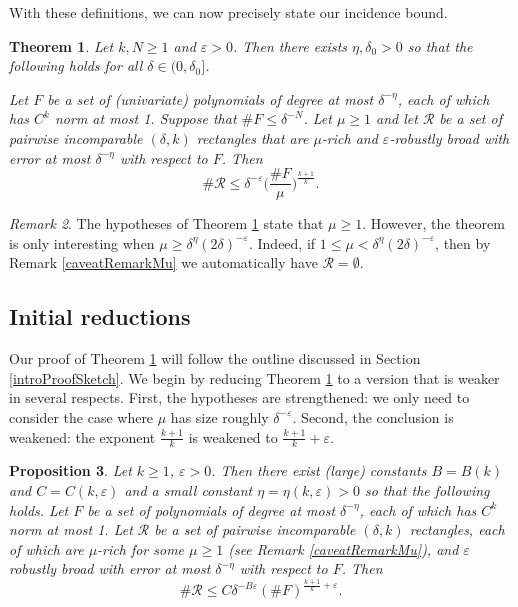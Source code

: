 \documentclass[letterpaper, reqno,11pt]{article}
\numberwithin{equation}{section}
\newcommand{\eps}{\varepsilon}
\newtheorem{thm}{Theorem}
\numberwithin{thm}{section}
\newtheorem{prop}[thm]{Proposition}
\theoremstyle{remark}
\newtheorem{rem}[thm]{Remark}
\begin{document}
With these definitions, we can now precisely state our incidence bound. 

\begin{thm}\label{RectBoundThm}
Let $k,N\geq 1$ and $\eps>0$. Then there exists $\eta,\delta_0>0$ so that the following holds for all $\delta\in(0,\delta_0]$. 

Let $F$ be a set of (univariate) polynomials of degree at most $\delta^{-\eta}$, each of which has $C^{k}$ norm at most 1. Suppose that $\#F\leq\delta^{-N}$. Let $\mu\geq 1$ and let $\mathcal{R}$ be a set of pairwise incomparable $(\delta,k)$ rectangles that are $\mu$-rich and $\eps$-robustly broad with error at most $\delta^{-\eta}$ with respect to $F$. Then
\begin{equation}\label{RectBdEqn}
\# \mathcal{R} \leq \delta^{-\eps} \Big(\frac{\# F}{\mu}\Big)^{\frac{k+1}{k}}.
\end{equation}
\end{thm}

\begin{rem}
The hypotheses of Theorem \ref{RectBoundThm} state that $\mu\geq 1$. However, the theorem is only interesting when $\mu\geq \delta^{\eta}(2\delta)^{-\eps}$. Indeed, if $1\leq \mu < \delta^{\eta}(2\delta)^{-\eps}$, then by Remark \ref{caveatRemarkMu} we automatically have $\mathcal{R} = \emptyset.$
\end{rem}


\subsection{Initial reductions}
Our proof of Theorem \ref{RectBoundThm} will follow the outline discussed in Section \ref{introProofSketch}. We begin by reducing Theorem \ref{RectBoundThm} to a version that is weaker in several respects. First, the hypotheses are strengthened: we only need to consider the case where $\mu$ has size roughly $\delta^{-\eps}$. Second, the conclusion is weakened: the exponent $\frac{k+1}{k}$ is weakened to $\frac{k+1}{k}+\eps$. 



\begin{prop}\label{tangencyRectanglesAlgCurvesProp}
Let $k\geq 1$, $\eps>0$. Then there exist (large) constants $B=B(k)$ and $C= C(k,\eps)$ and a small constant $\eta=\eta(k,\eps)>0$ so that the following holds. Let $F$ be a set of polynomials of degree at most $\delta^{-\eta}$, each of which has $C^{k}$ norm at most 1. Let $\mathcal{R}$ be a set of pairwise incomparable $(\delta,k)$ rectangles, each of which are $\mu$-rich for some $\mu\geq 1$ (see Remark \ref{caveatRemarkMu}), and $\eps$ robustly broad with error at most $\delta^{-\eta}$ with respect to $F$. Then
\begin{equation}\label{RectBdEqnForPolysMuSmall}
\# \mathcal{R} \leq C  \delta^{-B \eps} (\# F)^{\frac{k+1}{k}+\eps}.
\end{equation}
\end{prop}
\end{document}
